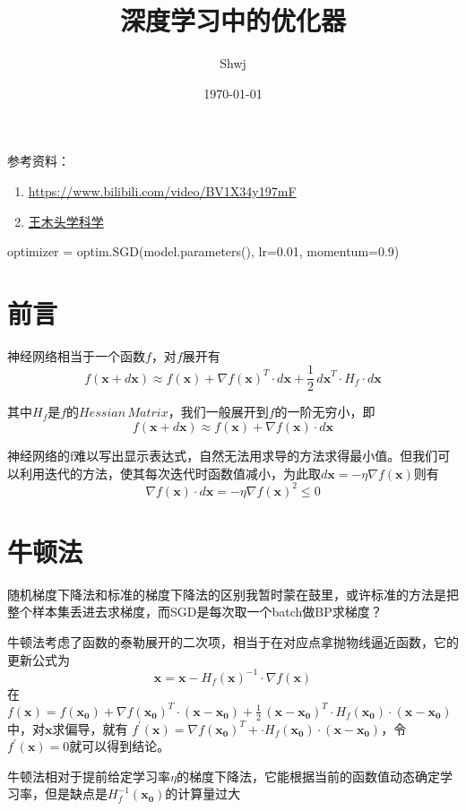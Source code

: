 \documentclass[12pt, a4paper, oneside]{ctexart}
\title{深度学习中的优化器}
\author{Shwj}
\date{\today}
\begin{document}
\maketitle



\par
参考资料：
\begin{enumerate}
    \item \href{https://www.bilibili.com/video/BV1X34y197mF}{https://www.bilibili.com/video/BV1X34y197mF} 
    \item \href{https://www.bilibili.com/video/BV1r64y1s7fU}{王木头学科学} 
\end{enumerate}

\begin{python}
    optimizer = optim.SGD(model.parameters(), 
                lr=0.01, momentum=0.9)
\end{python}

\section{前言}

\par 
神经网络相当于一个函数$f$，对$f$展开有
$$f(\boldsymbol{x}+d \boldsymbol{x}) \approx f(\boldsymbol{x})+{\nabla f(\boldsymbol{x})}^{T} \cdot d \boldsymbol{x} + \frac{1}{2} \, {d \boldsymbol{x}}^{T} \cdot H_f \cdot d \boldsymbol{x}$$
\par
其中$H_f$是$f$的$Hessian \, Matrix$，我们一般展开到$f$的一阶无穷小，即$$f(\boldsymbol{x}+d \boldsymbol{x}) \approx f(\boldsymbol{x})+\nabla f(\boldsymbol{x}) \cdot d \boldsymbol{x}$$
\par
神经网络的f难以写出显示表达式，自然无法用求导的方法求得最小值。但我们可以利用迭代的方法，使其每次迭代时函数值减小，为此取$d \boldsymbol{x} =-\eta \nabla f(\boldsymbol{x})$则有
$$\nabla f(\boldsymbol{x}) \cdot d \boldsymbol{x} =-\eta \nabla {f(\boldsymbol{x})}^2 \leq 0$$
\section{牛顿法}
\par
随机梯度下降法和标准的梯度下降法的区别我暂时蒙在鼓里，或许标准的方法是把整个样本集丢进去求梯度，而SGD是每次取一个batch做BP求梯度？
\par
牛顿法考虑了函数的泰勒展开的二次项，相当于在对应点拿抛物线逼近函数，它的更新公式为$$ \boldsymbol{x} = \boldsymbol{x} - {H_f(\boldsymbol{x})}^{-1} \cdot \nabla f(\boldsymbol{x})$$
在$f(\boldsymbol{x}) = f(\boldsymbol{x_0})+{\nabla f(\boldsymbol{x_0})}^{T} \cdot (\boldsymbol{x}-\boldsymbol{x_0}) + \frac{1}{2} \, {(\boldsymbol{x}-\boldsymbol{x_0})}^{T} \cdot H_f(\boldsymbol{x_0}) \cdot (\boldsymbol{x}-\boldsymbol{x_0})$中，对$\boldsymbol{x}$求偏导，就有
$f^{'}(\boldsymbol{x}) = {\nabla f(\boldsymbol{x_0})}^{T} + \cdot H_f(\boldsymbol{x_0}) \cdot (\boldsymbol{x}-\boldsymbol{x_0})$，令$f^{'}(\boldsymbol{x})=0$就可以得到结论。
\par
牛顿法相对于提前给定学习率$\eta$的梯度下降法，它能根据当前的函数值动态确定学习率，但是缺点是$H_f^{-1}(\boldsymbol{x_0})$的计算量过大
\end{document}

